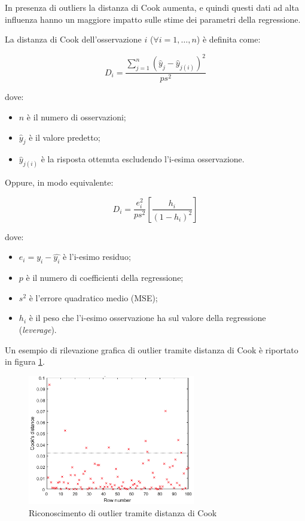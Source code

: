 In presenza di outliers la distanza di Cook aumenta, e quindi questi dati ad alta influenza hanno un maggiore impatto sulle stime dei parametri della regressione.

La distanza di Cook \cite{cook_def} dell'osservazione $i$ ($\forall i=1, \ldots, n$) è definita come:

$$D_{i}=\frac{\sum_{j=1}^{n}\left(\hat{y}_{j}-\hat{y}_{j(i)}\right)^{2}}{p s^{2}}$$\smallskip

dove:

\begin{itemize}
  \item $n$ è il numero di osservazioni;
  \item $\hat{y}_{j}$ è il valore predetto;
  \item $\hat{y}_{j(i)}$ è la risposta ottenuta escludendo l'i-esima osservazione.
\end{itemize}

Oppure, in modo equivalente:

$$D_{i}=\frac{e_{i}^2}{p s^{2}}\left[\frac{h_{i}}{\left(1-h_{i}\right)^{2}}\right]$$\smallskip

dove:

\begin{itemize}
  \item $e_{i} = y_i - \hat{y_i}$  è l'i-esimo residuo;
  \item $p$ è il numero di coefficienti della regressione;
  \item $s^2$ è l'errore quadratico medio (MSE);
  \item $h_i$ è il peso che l'i-esimo osservazione ha sul valore della regressione (\textit{leverage}).
\end{itemize}

Un esempio di rilevazione grafica di outlier tramite distanza di Cook è riportato in figura \ref{fig:cook}.

\begin{figure}[H]
\centering
\includegraphics[width=0.65\textwidth,height=\textheight,keepaspectratio]{img/cook.png}
\caption{Riconoscimento di outlier tramite distanza di Cook}
\label{fig:cook}
\end{figure}

